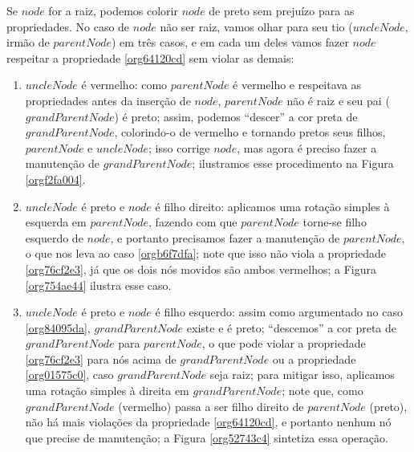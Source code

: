 \documentclass[11pt]{article}
\begin{document}
Se \(node\) for a raiz, podemos colorir \(node\) de preto sem prejuízo
para as propriedades.  No caso de \(node\) não ser raiz, vamos olhar
para seu tio (\(uncleNode\), irmão de \(parentNode\)) em três casos,
e em cada um deles vamos fazer \(node\) respeitar a propriedade
\ref{org64120cd} sem violar as demais:
\begin{enumerate}
\item \label{org84095da} \(uncleNode\) é vermelho: como \(parentNode\) é
vermelho e respeitava as propriedades antes da inserção de
\(node\), \(parentNode\) não é raiz e seu pai (\(grandParentNode\)) é
preto; assim, podemos ``descer'' a cor preta de
\(grandParentNode\), colorindo-o de vermelho e tornando pretos
seus filhos, \(parentNode\) e \(uncleNode\); isso corrige \(node\),
mas agora é preciso fazer a manutenção de \(grandParentNode\);
ilustramos esse procedimento na Figura \ref{orgf2fa004}.
\item \(uncleNode\) é preto e \(node\) é filho direito: aplicamos uma
rotação simples à esquerda em \(parentNode\), fazendo com que
\(parentNode\) torne-se filho esquerdo de \(node\), e portanto
precisamos fazer a manutenção de \(parentNode\), o que nos leva
ao caso \ref{orgb6f7dfa}; note que isso não viola a
propriedade \ref{org76cf2e3}, já que os dois nós
movidos são ambos vermelhos; a Figura \ref{org754ae44}
ilustra esse caso.
\item \label{orgb6f7dfa} \(uncleNode\) é preto e \(node\) é
filho esquerdo: assim como argumentado no caso \ref{org84095da},
\(grandParentNode\) existe e é preto; ``descemos'' a cor preta de
\(grandParentNode\) para \(parentNode\), o que pode violar a
propriedade \ref{org76cf2e3} para nós acima de
\(grandParentNode\) ou a propriedade \ref{org01575c0}, caso
\(grandParentNode\) seja raiz; para mitigar isso, aplicamos uma
rotação simples à direita em \(grandParentNode\); note que, como
\(grandParentNode\) (vermelho) passa a ser filho direito de
\(parentNode\) (preto), não há mais violações da propriedade
\ref{org64120cd}, e portanto nenhum nó que precise de
manutenção; a Figura \ref{org52743c4} sintetiza essa
operação.

\begin{figure}
  \centering
\end{figure}
\end{enumerate}
\end{document}
